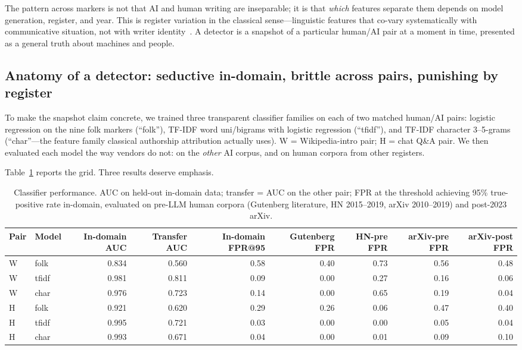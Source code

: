 \documentclass[sigconf,nonacm]{acmart}
\begin{document}
The pattern across markers is not that AI and human writing are inseparable; it is that \emph{which} features separate them depends on model generation, register, and year. This is register variation in the classical sense---linguistic features that co-vary systematically with communicative situation, not with writer identity~\cite{r16}. A detector is a snapshot of a particular human/AI pair at a moment in time, presented as a general truth about machines and people.

\subsection{Anatomy of a detector: seductive in-domain, brittle across pairs, punishing by register}

To make the snapshot claim concrete, we trained three transparent classifier families on each of two matched human/AI pairs: logistic regression on the nine folk markers (``folk''), TF-IDF word uni/bigrams with logistic regression (``tfidf''), and TF-IDF character 3--5-grams (``char''---the feature family classical authorship attribution actually uses). W = Wikipedia-intro pair; H = chat Q\&A pair. We then evaluated each model the way vendors do not: on the \emph{other} AI corpus, and on human corpora from other registers.

Table~\ref{tab:grid} reports the grid. Three results deserve emphasis.

\begin{table}[t]
\centering
\small
\caption{Classifier performance. AUC on held-out in-domain data; transfer = AUC on the other pair; FPR at the threshold achieving 95\% true-positive rate in-domain, evaluated on pre-LLM human corpora (Gutenberg literature, HN 2015--2019, arXiv 2010--2019) and post-2023 arXiv.}
\label{tab:grid}
\begin{tabular}{@{}llrrrrrrr@{}}
\toprule
Pair & Model & In-domain AUC & Transfer AUC & In-domain FPR@95 & Gutenberg FPR & HN-pre FPR & arXiv-pre FPR & arXiv-post FPR \\
\midrule
W & folk & 0.834 & 0.560 & 0.58 & 0.40 & 0.73 & 0.56 & 0.48 \\
W & tfidf & 0.981 & 0.811 & 0.09 & 0.00 & 0.27 & 0.16 & 0.06 \\
W & char & 0.976 & 0.723 & 0.14 & 0.00 & 0.65 & 0.19 & 0.04 \\
H & folk & 0.921 & 0.620 & 0.29 & 0.26 & 0.06 & 0.47 & 0.40 \\
H & tfidf & 0.995 & 0.721 & 0.03 & 0.00 & 0.00 & 0.05 & 0.04 \\
H & char & 0.993 & 0.671 & 0.04 & 0.00 & 0.01 & 0.09 & 0.10 \\
\bottomrule
\end{tabular}
\end{table}
\end{document}
